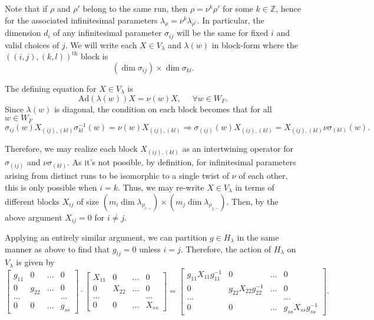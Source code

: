 \documentclass{memoir}
\newcommand{\bz}{\mathbb{Z}}
\newcommand{\tx}{\text}
\theoremstyle{definition}
\begin{document}
	Note that if $\rho$ and $\rho'$ belong to the same run, then $\rho=\nu^k\rho'$ for some $k\in \bz$, hence for the associated infinitesimal parameters $\lambda_\rho=\nu^k\lambda_{\rho'}$.  
	In particular, the dimension $d_i$ of any infinitesimal parameter $\sigma_{ij}$ will be the same for fixed $i$ and valid choices of $j$.  
	We will write each $X\in V_\lambda$ and $\lambda(w)$ in block-form where the $((i, j), (k,l))^{\tx{th}}$ block is 
	$$(\dim\sigma_{ij})\times\dim\sigma_{kl}.$$
	
	The defining equation for $X\in V_\lambda$ is
	$$\tx{Ad}(\lambda(w))X=\nu(w)X, \ \ \ \ \ \ \forall w\in W_F.$$
	Since $\lambda(w)$ is diagonal, the condition on each block becomes that for all $w\in W_F$
	$$\sigma_{ij}(w)X_{(ij),(kl)}\sigma_{kl}^{-1}(w)=\nu(w)X_{(ij),(kl)}\Rightarrow \sigma_{(ij)}(w)X_{(ij),(kl)}=X_{(ij),(kl)}\nu\sigma_{(kl)}(w).$$
	
	Therefore, we may realize each block $X_{(ij),(kl)}$ as an intertwining operator for $\sigma_{(ij)}$ and $\nu\sigma_{(kl)}$.  
	As it's not possible, by definition, for infinitesimal parameters arising from distinct runs to be isomorphic to a single twist of $\nu$ of each other, this is only possible when $i=k$.  
	Thus, we may re-write $X\in V_\lambda$ in terms of different blocks $X_{ij}$ of size $(m_i\dim \lambda_{\rho_{i,-}})\times( m_j\dim\lambda_{\rho_{j,-}})$.  
	Then, by the above argument $X_{ij}=0$ for $i\neq j$.
	
	Applying an entirely similar argument, we can partition $g\in H_\lambda$ in the same manner as above to find that $g_{ij}=0$ unless $i=j$.  
	Therefore, the action of $H_\lambda$ on $V_\lambda$ is given by 
	$$\begin{bmatrix}
		g_{11} & 0 & ... & 0 \\
		0 & g_{22} & ... & 0 \\
		... & & & ... \\
		0 & 0 & ... & g_{ss}
	\end{bmatrix}\cdot \begin{bmatrix}
		X_{11} & 0 & ... & 0 \\
		0 & X_{22} & ... & 0 \\
		... & & & ... \\
		0 & 0 & ... & X_{ss}
	\end{bmatrix}= \begin{bmatrix}
		g_{11}X_{11}g_{11}^{-1} & 0 & ... & 0 \\
		0 & g_{22}X_{22}g_{22}^{-1} & ... & 0 \\
		... & & & ... \\
		0 & 0 & ... & g_{ss}X_{ss}g_{ss}^{-1}
	\end{bmatrix}.$$
	
\end{document}
